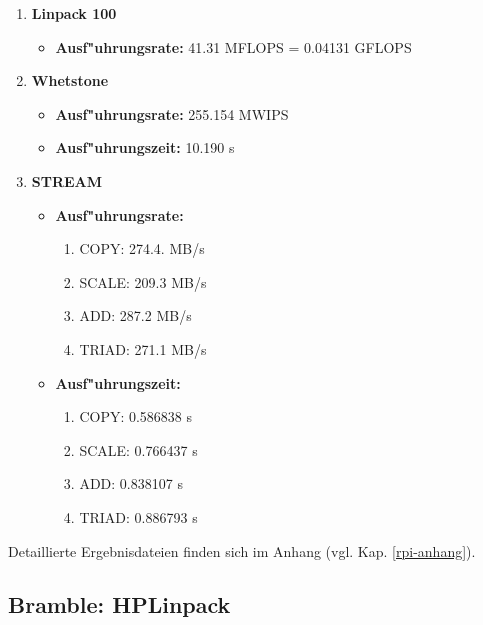 \begin{enumerate}
	\item \textbf{Linpack 100} 
	\begin{itemize}
		\item \textbf{Ausf"uhrungsrate:} 41.31 MFLOPS = 0.04131 GFLOPS
	\end{itemize}
	\item \textbf{Whetstone} 
	\begin{itemize}
		\item \textbf{Ausf"uhrungsrate:} 255.154 MWIPS
		\item \textbf{Ausf"uhrungszeit:} 10.190 s  
	\end{itemize}
	\item \textbf{STREAM} 
	\begin{itemize}
		\item \textbf{Ausf"uhrungsrate:}
		\begin{enumerate}
			\item COPY: 274.4. MB/s
			\item SCALE: 209.3 MB/s
			\item ADD: 287.2 MB/s
			\item TRIAD: 271.1 MB/s
		\end{enumerate}					 
		\item \textbf{Ausf"uhrungszeit:}
		\begin{enumerate}
			\item COPY: 0.586838 s
			\item SCALE: 0.766437 s
			\item ADD: 0.838107 s
			\item TRIAD: 0.886793 s
		\end{enumerate}
	\end{itemize}
\end{enumerate} 
Detaillierte Ergebnisdateien finden sich im Anhang (vgl. Kap. \ref{rpi-anhang}). 
 
\subsection{Bramble: HPLinpack}\label{Ergebnisse-HPL}

